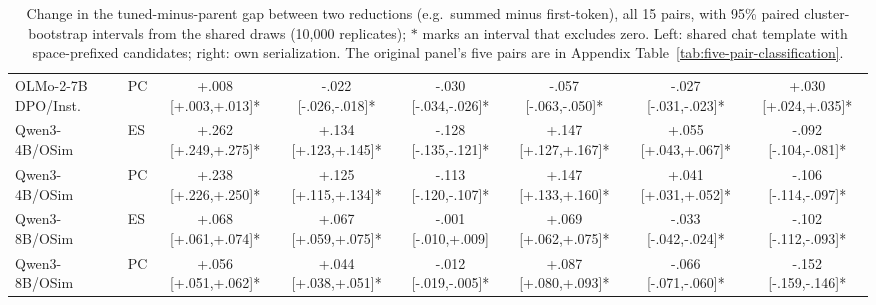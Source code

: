 \begin{table}[t]
\begin{tabular}{@{}llccc@{\hspace{8pt}}ccc@{}}
OLMo-2-7B DPO/Inst. & PC & +.008 [+.003,+.013]* & -.022 [-.026,-.018]* & -.030 [-.034,-.026]* & -.057 [-.063,-.050]* & -.027 [-.031,-.023]* & +.030 [+.024,+.035]* \\
Qwen3-4B/OSim & ES & +.262 [+.249,+.275]* & +.134 [+.123,+.145]* & -.128 [-.135,-.121]* & +.147 [+.127,+.167]* & +.055 [+.043,+.067]* & -.092 [-.104,-.081]* \\
Qwen3-4B/OSim & PC & +.238 [+.226,+.250]* & +.125 [+.115,+.134]* & -.113 [-.120,-.107]* & +.147 [+.133,+.160]* & +.041 [+.031,+.052]* & -.106 [-.114,-.097]* \\
Qwen3-8B/OSim & ES & +.068 [+.061,+.074]* & +.067 [+.059,+.075]* & -.001 [-.010,+.009] & +.069 [+.062,+.075]* & -.033 [-.042,-.024]* & -.102 [-.112,-.093]* \\
Qwen3-8B/OSim & PC & +.056 [+.051,+.062]* & +.044 [+.038,+.051]* & -.012 [-.019,-.005]* & +.087 [+.080,+.093]* & -.066 [-.071,-.060]* & -.152 [-.159,-.146]* \\
\bottomrule
\end{tabular}
\caption{Change in the tuned-minus-parent gap between two reductions (e.g.\ summed minus first-token), all 15 pairs, with 95\% paired cluster-bootstrap intervals from the shared draws (10,000 replicates); $*$ marks an interval that excludes zero. Left: shared chat template with space-prefixed candidates; right: own serialization. The original panel's five pairs are in Appendix Table~\ref{tab:five-pair-classification}.}
\label{tab:gap-changes-15}
\end{table}

